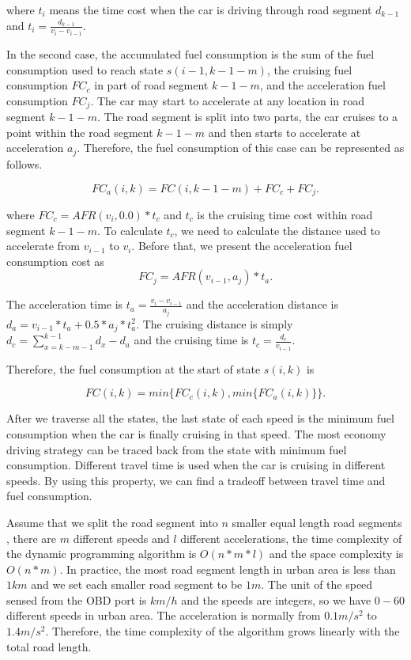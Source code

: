 where $t_i$ means the time cost when the car is driving
through road segment $d_{k - 1}$
and $t_i = \frac{d_{k - 1}}{v_i - v_{i - 1}}$. 


In the second case, the accumulated fuel consumption 
is the sum of the fuel consumption used to reach 
state $s(i - 1, k - 1 - m)$, the cruising fuel consumption 
$FC_c$ in part of road segment $k - 1 - m$, 
and the acceleration fuel consumption $FC_j$. 
The car may start to accelerate at any location in 
road segment $k - 1 - m$.  
The road segment is split into two parts, 
the car cruises to a point within the road segment
$k - 1 - m$ and then starts to accelerate at 
acceleration $a_j$. 
Therefore, the fuel consumption of this case can
be represented as follows. 

\begin{equation}
FC_a(i, k) = FC(i, k - 1 - m) + FC_c + FC_j. 
\end{equation}


where $FC_c = AFR(v_i, 0.0) * t_c$ and $t_c$ is
the cruising time cost within road segment $k - 1 - m$.
To calculate $t_c$, we need to calculate the distance
used to accelerate from $v_{i - 1}$ to $v_{i}$. 
Before that, we present 
the acceleration fuel consumption cost as
\begin{equation}
FC_j = AFR(v_{i - 1}, a_j) * t_a. 
\end{equation}

The acceleration time is $t_a = \frac{v_i - v_{i - 1}}{a_j}$ and
the acceleration distance is $d_a = v_{i - 1} * t_a + 0.5 * a_j * t_a^2$. 
The cruising distance is simply $d_c = \sum_{x = k - m - 1}^{k - 1}{d_x} - d_a$
and the cruising time is $t_c = \frac{d_c}{v_{i - 1}}$. 


Therefore, the fuel consumption at the start of state $s(i, k)$ is

\begin{equation}
FC(i, k) = min\{FC_c(i, k), min\{FC_a(i, k)\}\}. 
\end{equation}

After we traverse all the states, the last state of each speed
is the minimum fuel consumption when the car is finally cruising
in that speed. The most economy driving strategy can be traced
back from the state with minimum fuel consumption. 
Different travel time is used when the car is cruising in 
different speeds. 
By using this property, we can find a tradeoff between travel
time and fuel consumption. 


Assume that we split the road segment into $n$ smaller equal length road segments
, there are $m$ different speeds and $l$ different accelerations, 
the time complexity of the dynamic programming algorithm is $O(n*m*l)$
and the space complexity is $O(n * m)$. 
In practice, the most road segment length in urban area is less than $1km$
and we set each smaller road segment to be $1m$. 
The unit of the speed sensed from the OBD port is $km/h$ and the speeds are
integers, so we have $0-60$ different speeds in 
urban area. 
The acceleration is normally from $0.1m/s^2$ to $1.4m/s^2$. 
Therefore, the time complexity of the algorithm grows linearly 
with the total road length. 



